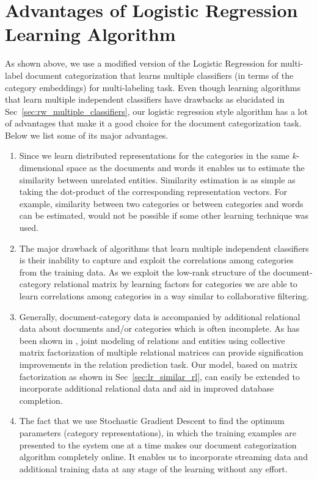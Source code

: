 \section{Advantages of Logistic Regression Learning Algorithm}
\label{sec:adv:lr}
As shown above, we use a modified version of the Logistic Regression for multi-label document categorization that learns multiple classifiers (in terms of the category embeddings) for multi-labeling task. Even though learning algorithms that learn multiple independent classifiers have drawbacks as elucidated in Sec~\ref{sec:rw_multiple_classifiers}, our logistic regression style algorithm has a lot of advantages that make it a good choice for the document categorization task. Below we list some of its major advantages.
\begin{enumerate}
\item 
Since we learn distributed representations for the categories in the same $k$-dimensional space as the documents and words it enables us to estimate the similarity between unrelated entities. Similarity estimation is as simple as taking the dot-product of the corresponding representation vectors. For example, similarity between two categories or between categories and words can be estimated, would not be possible if some other learning technique was used. 

\item 
The major drawback of algorithms that learn multiple independent classifiers is their inability to capture and exploit the correlations among categories from the training data. As we exploit the low-rank structure of the document-category relational matrix by learning factors for categories we are able to learn correlations among categories in a way similar to collaborative filtering.

\item 
Generally, document-category data is accompanied by additional relational data about documents and/or categories which is often incomplete. As has been shown in \citet{gupta2015collectively}, joint modeling of relations and entities using collective matrix factorization of multiple relational matrices can provide signification improvements in the relation prediction task. 
Our model, based on matrix factorization as shown in Sec~\ref{sec:lr_similar_rl}, can easily be extended to incorporate additional relational data and aid in improved database completion. 

\item 
The fact that we use Stochastic Gradient Descent to find the optimum parameters (category representations), in which the training examples are presented to the system one at a time makes our document categorization algorithm completely online. It enables us to incorporate streaming data and additional training data at any stage of the learning without any effort.  
\end{enumerate}